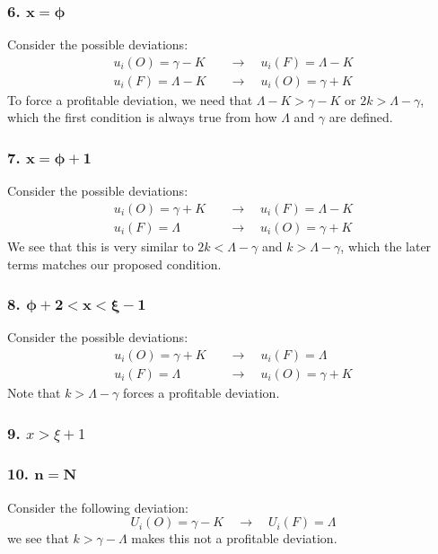 \documentclass[12pt]{article}
\begin{document}
\subsubsection*{6. $\mathbf{x = \phi}$}
Consider the possible deviations:
\begin{align*}
    u_i(O) = \gamma - K \quad &\to \quad u_i(F) = \Lambda - K \\
    u_i(F) = \Lambda - K\quad &\to \quad u_i(O) = \gamma + K
\end{align*}
To force a profitable deviation, we need that $\Lambda - K > \gamma - K$ or $2k > \Lambda - \gamma$, which the first condition is always true from how $\Lambda$ and $\gamma$ are defined. 
\subsubsection*{7. $\mathbf{x = \phi + 1}$}
Consider the possible deviations:
\begin{align*}
    u_i(O) = \gamma + K \quad &\to \quad u_i(F) = \Lambda - K \\
    u_i(F) = \Lambda \quad &\to \quad u_i(O) = \gamma + K
\end{align*}
We see that this is very similar to $2k < \Lambda - \gamma$ and $k > \Lambda - \gamma$, which the later terms matches our proposed condition. 
\subsubsection*{8. $\mathbf{\phi + 2 < x < \xi -1}$}
Consider the possible deviations:
\begin{align*}
    u_i(O) = \gamma + K \quad &\to \quad u_i(F) = \Lambda\\
    u_i(F) = \Lambda \quad &\to \quad u_i(O) = \gamma + K
\end{align*}
Note that $k > \Lambda - \gamma$ forces a profitable deviation. 
\subsubsection*{9. $x > \xi + 1$}
\subsubsection*{10. $\mathbf{n = N}$}
Consider the following deviation:
\[
U_i(O) = \gamma - K \quad \to \quad  U_i(F) = \Lambda 
\]
we see that $k > \gamma - \Lambda$ makes this not a profitable deviation. 
\end{document}
